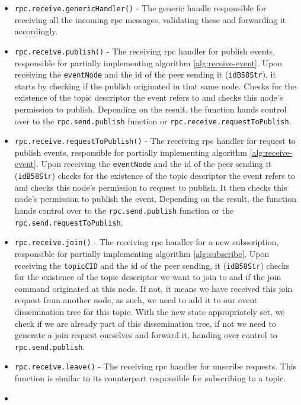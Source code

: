 \begin{itemize}
  \item
    \verb|rpc.receive.genericHandler()| - The generic handle responsible for receiving all the incoming \acrshort{rpc} messages, validating these and forwarding it accordingly.
  \item
    \verb|rpc.receive.publish()| - The receiving \acrshort{rpc} handler for publish events, responsible for partially implementing algorithm \ref{alg:receive-event}. Upon receiving the \verb|eventNode| and the id of the peer sending it (\verb|idB58Str|), it starts by checking if the publish originated in that same node. Checks for the existence of the topic descriptor the event refers to and checks this node's permission to publish. Depending on the result, the function hands control over to the \verb|rpc.send.publish| function or \verb|rpc.receive.requestToPublish|. 
  \item
    \verb|rpc.receive.requestToPublish()| - The receiving \acrshort{rpc} handler for request to publish events, responsible for partially implementing algorithm \ref{alg:receive-event}. Upon receiving the \verb|eventNode| and the id of the peer sending it (\verb|idB58Str|) checks for the existence of the topic descriptor the event refers to and checks this node's permission to request to publish. It then checks this node's permission to publish the event. Depending on the result, the function hands control over to the \verb|rpc.send.publish| function or the \verb|rpc.send.requestToPublish|. 
  \item
    \verb|rpc.receive.join()| - The receiving \acrshort{rpc} handler for a new subscription, responsible for partially implementing algorithm \ref{alg:subscribe}. Upon receiving the \verb|topicCID| and the id of the peer sending, it (\verb|idB58Str|) checks for the existence of the topic descriptor we want to join to and if the join command originated at this node. If not, it means we have received this join request from another node, as such, we need to add it to our event dissemination tree for this topic. With the new state appropriately set, we check if we are already part of this dissemination tree, if not we need to generate a join request ourselves and forward it, handing over control to \verb|rpc.send.publish|. 
  \item
    \verb|rpc.receive.leave()| - The receiving \acrshort{rpc} handler for unscribe requests. This function is similar to its counterpart responsible for subscribing to a topic.
  \item

\end{itemize}
